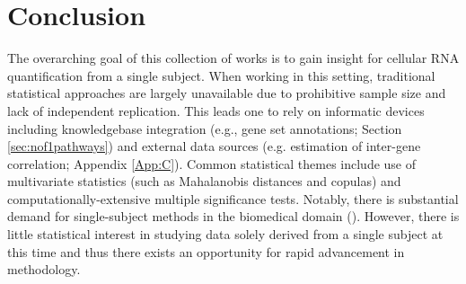 \chapter{Conclusion}\label{Chap:conclusion}



\indent\indent The overarching goal of this collection of works is to gain insight for cellular RNA quantification from a single subject. When working in this setting, traditional statistical approaches are largely unavailable due to prohibitive sample size and lack of independent replication. This leads one to rely on informatic devices including knowledgebase integration (e.g., gene set annotations; Section \ref{sec:nof1pathways}) and external data sources (e.g. estimation of inter-gene correlation; Appendix \ref{App:C}). Common statistical themes include use of multivariate statistics (such as Mahalanobis distances and copulas) and computationally-extensive multiple significance tests. Notably, there is substantial demand for single-subject methods in the biomedical domain (\cite{Bacchetti2011}). However, there is little statistical interest in studying data solely derived from a single subject at this time and thus there exists an opportunity for rapid advancement in methodology.


